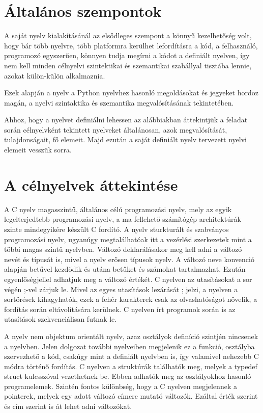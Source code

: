 
\section{Általános szempontok}

A saját nyelv kialakításánál az elsődleges szempont a könnyű kezelhetőség volt, hogy bár több nyelvre, több platformra kerülhet lefordításra a kód, a felhasználó, programozó egyszerűen, könnyen tudja megírni a kódot a definiált nyelven, így nem kell minden célnyelvi szintektikai és szemantikai szabállyal tisztába lennie, azokat külön-külön alkalmaznia.

Ezek alapján a nyelv a Python nyelvhez hasonló megoldásokat és jegyeket hordoz magán, a nyelvi szintaktika és szemantika megvalósításának tekintetében.

Ahhoz, hogy a nyelvet definiálni lehessen az alábbiakban áttekintjük a feladat során célnyelvként tekintett nyelveket általánosan, azok megvalósítását, tulajdonságait, fő elemeit. Majd ezután a saját definiált nyelv tervezett nyelvi elemeit vesszük sorra.

\section{A célnyelvek áttekintése}

A C nyelv magasszintű, általános célú programozási nyelv, mely az egyik legelterjedtebb programozási nyelv, a ma fellehető számítógép architektúrák szinte mindegyikére készült C fordító. A nyelv sturkturált és szabványos programozási nyelv, ugyanúgy megtalálhatóak itt a vezérlési szerkezetek mint a többi magas szintű nyelvben. Változó deklarálásakor meg kell adni a változó nevét és típusát is, mivel a nyelv erősen típusok nyelv. A változó neve konvenció alapján betűvel kezdődik és utána betűket és számokat tartalmazhat. Ezután egyenlőségjellel adhatjuk meg a változó értékét. C nyelven az utasításokat a sor végén ;-vel zárjuk le. Mivel az egyes utasítások lezárását ; jelzi, a nyelven a sortörések kihagyhatók, ezek a fehér karakterek csak az olvashatóságot növelik, a fordítás során eltávolítására kerülnek. C nyelven írt programok során is az utasítások szekvenciálisan futnak le.

A nyelv nem objektum orientált nyelv, azaz osztályok definíció szintjén nincsenek a nyelvben. Jelen dolgozat további nyelveiben megjelenik ez a funkció, osztályba szervezhető a kód, csakúgy mint a definiált nyelvben is, így valamivel nehezebb C módra történő fordítás. C nyelven a struktúrák találhatók meg, melyek a typedef struct kulcsszóval vezethetnek be. Ebben adhatók meg az osztályokhoz hasonló programelemek. Szintén fontos különbség, hogy a C nyelven megjelennek a pointerek, melyek egy adott változó címere mutató változók. Ezáltal érték szerint és cím szerint is át lehet adni változókat.

